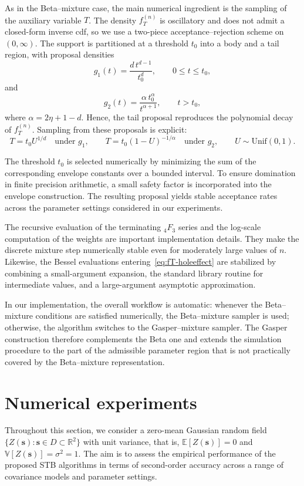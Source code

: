 \documentclass[
  12pt]{article}
\begin{document}
As in the Beta--mixture case, the main numerical ingredient is the sampling of the auxiliary variable $T$.
The density $f_T^{(n)}$ is oscillatory and does not admit a closed-form inverse cdf, so we use a two-piece acceptance--rejection scheme on $(0,\infty)$.
The support is partitioned at a threshold $t_0$ into a body and a tail region, with proposal densities
\[
g_1(t)=\frac{d\,t^{d-1}}{t_0^d},
\qquad 0\le t\le t_0,
\]
and
\[
g_2(t)=\frac{\alpha\,t_0^\alpha}{t^{\alpha+1}},
\qquad t>t_0,
\]
where
$
\alpha = 2\eta+1-d.
$
Hence, the tail proposal reproduces the polynomial decay of $f_T^{(n)}$.
Sampling from these proposals is explicit:
\[
T=t_0U^{1/d}\quad\text{under }g_1,
\qquad
T=t_0(1-U)^{-1/\alpha}\quad\text{under }g_2,
\qquad U\sim\mathrm{Unif}(0,1).
\]

The threshold $t_0$ is selected numerically by minimizing the sum of the corresponding envelope constants over a bounded interval.
To ensure domination in finite precision arithmetic, a small safety factor is incorporated into the envelope construction.
The resulting proposal yields stable acceptance rates across the parameter settings considered in our experiments.

The recursive evaluation of the terminating ${}_4F_3$ series and the log-scale computation of the weights are important implementation details.
They make the discrete mixture step numerically stable even for moderately large values of $n$.
Likewise, the Bessel evaluations entering~\eqref{eq:fT-holeeffect} are stabilized by combining a small-argument expansion, the standard library routine for intermediate values, and a large-argument asymptotic approximation.

In our implementation, the overall workflow is automatic:
whenever the Beta--mixture conditions are satisfied numerically, the Beta--mixture sampler is used; otherwise, the algorithm switches to the Gasper--mixture sampler.
The Gasper construction therefore complements the Beta one and extends the simulation procedure to the part of the admissible parameter region that is not practically covered by the Beta--mixture representation.




\section{Numerical experiments}
\label{sec6}

Throughout this section, we consider a zero-mean Gaussian random field
$\{Z(\mathbf{s}) : \mathbf{s}\in D\subset\mathbb{R}^2\}$ with unit variance, that is,
$\mathbb{E}[Z(\mathbf{s})]=0$ and $\mathbb{V}[Z(\mathbf{s})]=\sigma^2=1$.
The aim is to assess the empirical performance of the proposed STB algorithms in terms of second-order accuracy across a range of covariance models and parameter settings.
\end{document}
